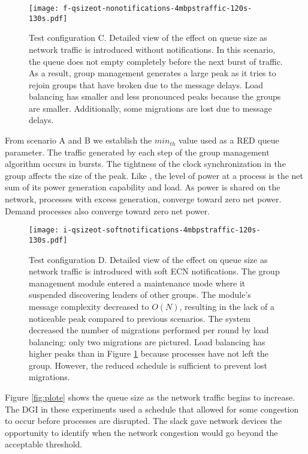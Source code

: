 \begin{figure}
\centering
\texttt{[image: f-qsizeot-nonotifications-4mbpstraffic-120s-130s.pdf]}
\caption[Detailed view of the effect on queue size as other network traffic is introduced without notifications.]{
    Test configuration C.
Detailed view of the effect on queue size as network traffic is introduced without notifications.
In this scenario, the queue does not empty completely before the next burst of traffic.
As a result, group management generates a large peak as it tries to rejoin groups that have broken due to the message delays.
Load balancing has smaller and less pronounced peaks because the groups are smaller.
Additionally, some migrations are lost due to message delays.}
\label{fig:plotf}
\end{figure}

From scenario A and B we establish the $min_{th}$ value used as a \ac{RED} queue parameter.
The traffic generated by each step of the group management algorithm occurs in bursts.
The tightness of the clock synchronization in the group affects the size of the peak.
Like \cite{HILTESTBED}, the level of power at a process is the net sum of its power generation capability and load.
As power is shared on the network, processes with excess generation, converge toward zero net power.
Demand processes also converge toward zero net power.

\begin{figure}
\centering
\texttt{[image: i-qsizeot-softnotifications-4mbpstraffic-120s-130s.pdf]}
\caption[Detailed view of the effect on queue size as other network traffic is introduced with soft \ac{ECN} notifications.]{
    Test configuration D.
Detailed view of the effect on queue size as network traffic is introduced with soft \ac{ECN} notifications.
The group management module entered a maintenance mode where it suspended discovering leaders of other groups.
The module's message complexity decreased to $O(N)$, resulting in the lack of a noticeable peak compared to previous scenarios.
The system decreased the number of migrations performed per round by load balancing: only two migrations are pictured.
Load balancing has higher peaks than in Figure \ref{fig:plotf} because processes have not left the group.
However, the reduced schedule is sufficient to prevent lost migrations.
}
\label{fig:ploti}
\end{figure}

Figure \ref{fig:plote} shows the queue size as the network traffic begins to increase.
The \ac{DGI} in these experiments used a schedule that allowed for some congestion to occur before processes are disrupted.
The slack gave network devices the opportunity to identify when the network congestion would go beyond the acceptable threshold.


